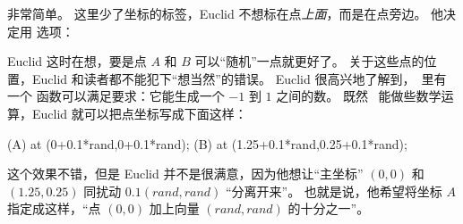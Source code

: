 \bohs

非常简单。
这里少了坐标的标签，Euclid 不想标在点\emph{上面}，而是在点旁边。
他决定用  选项：

\eohs

\begin{codeexample}[]
\end{codeexample}

\bohs

Euclid 这时在想，要是点 $A$ 和 $B$ 可以“随机”一点就更好了。
关于这些点的位置，Euclid 和读者都不能犯下“想当然”的错误。
Euclid 很高兴地了解到，\tikzname\ 里有一个  函数可以满足要求：它能生成一个 $-1$ 到 $1$ 之间的数。
既然 \tikzname\ 能做些数学运算，Euclid 就可以把点坐标写成下面这样：

\eohs

\begin{codeexample}
\coordinate [...] (A) at (0+0.1*rand,0+0.1*rand);
\coordinate [...] (B) at (1.25+0.1*rand,0.25+0.1*rand);
\end{codeexample}

\bohs

这个效果不错，但是 Euclid 并不是很满意，因为他想让“主坐标” $(0,0)$ 和 $(1.25,0.25)$ 同扰动 $0.1(\mathit{rand},\mathit{rand})$ “分离开来”。
也就是说，他希望将坐标 $A$ 指定成这样，“点 $(0,0)$ 加上向量 $(\mathit{rand},\mathit{rand})$ 的十分之一”。

